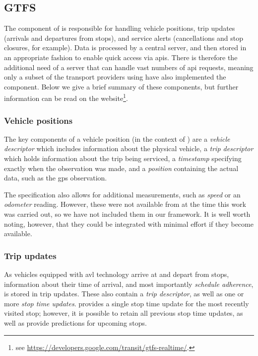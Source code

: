 \subsection{\Rt{} GTFS}
\label{sec:gtfs_rt}

The \rt{} component of \GTFS{} is responsible for handling vehicle positions, trip updates (arrivals and departures from stops), and service alerts (cancellations and stop closures, for example). Data is processed by a central server, and then stored in an appropriate fashion to enable quick access via \glspl{api}. There is therefore the additional need of a server that can handle vast numbers of \gls{api} requests, meaning only a subset of the transport providers using \GTFS{} have also implemented the \rt{} component. Below we give a brief summary of these components, but further information can be read on the \GTFS{} website\footnote{see \url{https://developers.google.com/transit/gtfs-realtime/}.}.


\subsubsection{Vehicle positions}
\label{sec:gtfs_rt_vehicle}

The key components of a vehicle position (in the context of \GTFS{}) are a \emph{vehicle descriptor} which includes information about the physical vehicle, a \emph{trip descriptor} which holds information about the trip being serviced, a \emph{timestamp} specifying exactly when the observation was made, and a \emph{position} containing the actual data, such as the \gls{gps} observation.

The specification also allows for additional measurements, such as \emph{speed} or an \emph{odometer} reading. However, these were not available from \AT{} at the time this work was carried out, so we have not included them in our framework. It is well worth noting, however, that they could be integrated with minimal effort if they become available.


\subsubsection{Trip updates}
\label{sec:gtfs_rt_trip}

As vehicles equipped with \gls{avl} technology arrive at and depart from stops, information about their time of arrival, and most importantly \emph{schedule adherence}, is stored in trip updates. These also contain a \emph{trip descriptor}, as well as one or more \emph{stop time updates}. \AT{} provides a single stop time update for the most recently visited stop; however, it is possible to retain all previous stop time updates, as well as provide predictions for upcoming stops.


